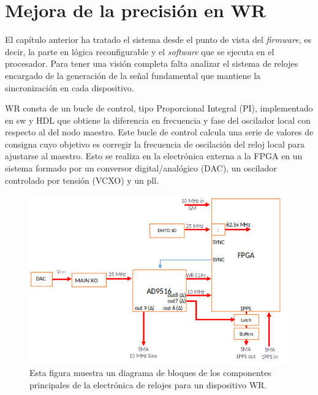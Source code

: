 \chapter{Mejora de la precisión en WR} \label{cap:reloj}

El capítulo anterior ha tratado el sistema desde el punto de vista del 
\textit{firmware}, es decir, la parte en lógica reconfigurable y el 
\textit{software} que se ejecuta en el procesador. Para tener una visión 
completa falta analizar el sistema de relojes encargado de la generación de la 
señal fundamental que mantiene la sincronización en cada dispositivo.

WR consta de un bucle de control, tipo Proporcional Integral (PI), implementado 
en sw y HDL que obtiene la 
diferencia en frecuencia y fase del oscilador local con respecto al del nodo 
maestro. Este bucle de control calcula una serie de valores de consigna cuyo 
objetivo es corregir la frecuencia de oscilación del reloj local para ajustarse 
al maestro. Esto se realiza en la electrónica externa a la FPGA en un sistema 
formado por un conversor digital/analógico (DAC), un oscilador controlado por 
tensión (VCXO) y un \gls{pll}.

\begin{figure}
	\centering
	\includegraphics[width=0.7\linewidth]{imagenes/wrclk}
	\caption[Esquema del sistema de reloj en WR]{Esta figura muestra un 
	diagrama de bloques de los componentes principales de la electrónica de 
	relojes para un dispositivo WR.}
	\label{fig:wrclk}
\end{figure}

